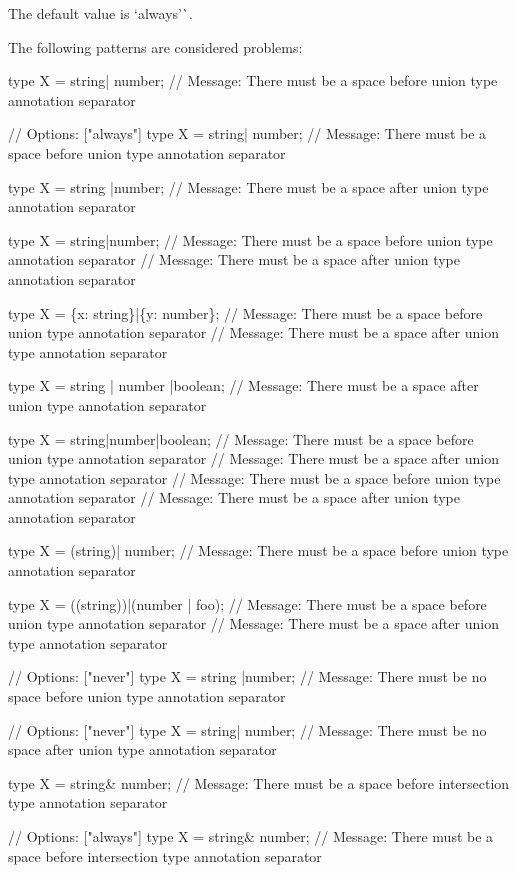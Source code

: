 The default value is `\textquotesingle{}always'\`{}.

The following patterns are considered problems\+:


\begin{DoxyCode}
type X = string| number;
// Message: There must be a space before union type annotation separator

// Options: ["always"]
type X = string| number;
// Message: There must be a space before union type annotation separator

type X = string |number;
// Message: There must be a space after union type annotation separator

type X = string|number;
// Message: There must be a space before union type annotation separator
// Message: There must be a space after union type annotation separator

type X = \{x: string\}|\{y: number\};
// Message: There must be a space before union type annotation separator
// Message: There must be a space after union type annotation separator

type X = string | number |boolean;
// Message: There must be a space after union type annotation separator

type X = string|number|boolean;
// Message: There must be a space before union type annotation separator
// Message: There must be a space after union type annotation separator
// Message: There must be a space before union type annotation separator
// Message: There must be a space after union type annotation separator

type X = (string)| number;
// Message: There must be a space before union type annotation separator

type X = ((string))|(number | foo);
// Message: There must be a space before union type annotation separator
// Message: There must be a space after union type annotation separator

// Options: ["never"]
type X = string |number;
// Message: There must be no space before union type annotation separator

// Options: ["never"]
type X = string| number;
// Message: There must be no space after union type annotation separator

type X = string& number;
// Message: There must be a space before intersection type annotation separator

// Options: ["always"]
type X = string& number;
// Message: There must be a space before intersection type annotation separator


\end{DoxyCode}
